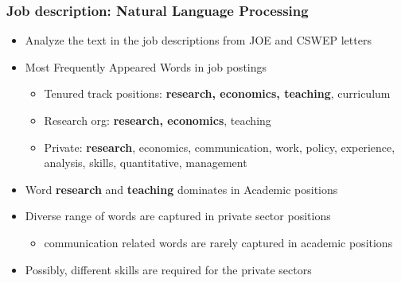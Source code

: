\documentclass[10pt,svgnames,fragile]{beamer}
\begin{document}
\begin{frame}[label = NLP]
	\frametitle{Job description: Natural Language Processing}
	\begin{itemize}
		\item Analyze the text in the job descriptions from JOE and CSWEP letters
\vfill
		\item Most Frequently Appeared Words in job postings
		\begin{itemize}
			\vspace{1 mm}
			\item Tenured track positions: \textbf{research, economics, teaching}, curriculum
			\vspace{1 mm}
			\item Research org: \textbf{research, economics}, teaching
			\vspace{1 mm}
			\item Private: \textbf{research}, economics, communication, work, policy, experience, analysis, skills, quantitative, management
		\end{itemize}
\vfill		
		\item Word \textbf{research} and \textbf{teaching} dominates in Academic positions
\vfill
		\item Diverse range of words are captured in private sector positions
		\vspace{1 mm}
		\begin{itemize}
			\item communication related words are rarely captured in academic positions
		\end{itemize} 
\vfill
		\item Possibly, different skills are required for the private sectors \hyperlink{job_des}{}
\vfill
	\end{itemize}
\end{frame}
\end{document}
